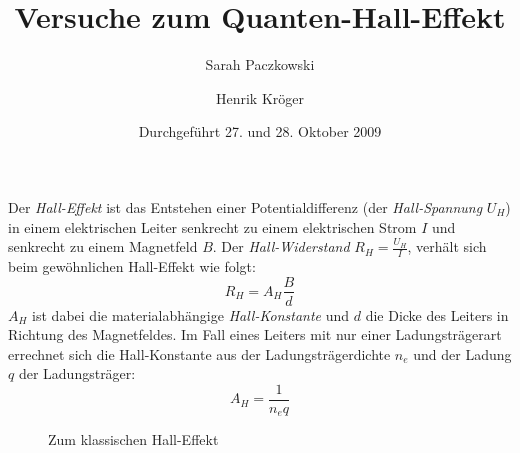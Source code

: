 \documentclass[a4paper]{article}
\begin{document}


\title{Versuche zum Quanten-Hall-Effekt}
\author{Sarah Paczkowski \and Henrik Kröger}
\date{Durchgeführt 27. und 28. Oktober 2009}

\maketitle

\noindent
Der \emph{Hall-Effekt} ist das Entstehen einer Potentialdifferenz
(der \emph{Hall-Spannung} $U_H$)
in einem elektrischen Leiter senkrecht zu einem elektrischen Strom $I$ und
senkrecht zu einem Magnetfeld $B$.
Der \emph{Hall-Widerstand} $R_H = \frac{U_H}{I}$,
verhält sich beim gewöhnlichen Hall-Effekt wie folgt:
\begin{equation} R_H = A_H \frac{B}{d} \end{equation}
$A_H$ ist dabei die materialabhängige \emph{Hall-Konstante} und
$d$ die Dicke des Leiters in Richtung des Magnetfeldes.
Im Fall eines Leiters mit nur einer Ladungsträgerart errechnet sich
die Hall-Konstante aus der Ladungsträgerdichte $n_e$ und
der Ladung $q$ der Ladungsträger:
\begin{equation} A_H = \frac{1}{n_eq} \end{equation}

\begin{figure}[hb]
\begin{center}
\end{center}
\caption{Zum klassischen Hall-Effekt}
\end{figure}
\end{document}
